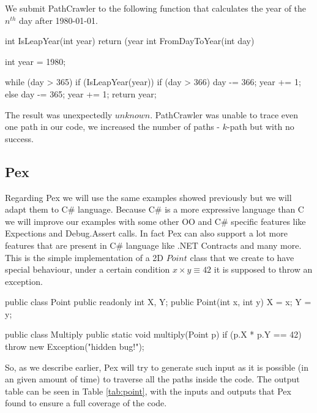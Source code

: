 \documentclass[10pt, conference, compsocconf]{IEEEtran}
\begin{document}
We submit PathCrawler to the following function that calculates the year of the $n^{th}$ day after 1980-01-01.

\begin{code}
int IsLeapYear(int year) {
  return (year %
}
int FromDayToYear(int day) {
  int year = 1980;

  while (day > 365) {
    if (IsLeapYear(year)) {
      if (day > 366) {
        day -= 366;
        year += 1;
      }
    } else {
      day -= 365;
      year += 1;
    }
  }
  return year;
}
\end{code}

The result was unexpectedly $unknown$. PathCrawler was unable to trace even one path in our code, we increased the number of paths - $k$-path but with no success.

\subsection{Pex}
Regarding Pex we will use the same examples showed previously but we will adapt them to C\# language.
Because C\# is a more expressive language than C we will improve our examples with some other OO and C\# specific features like Expections and Debug.Assert calls.
In fact Pex can also support a lot more features that are present in C\# language like .NET Contracts and many more.\\
This is the simple implementation of a 2D $Point$ class that we create to have special behaviour, under a certain condition
$x \times y \equiv 42$ it is supposed to throw an exception.

\begin{code}
public class Point {
  public readonly int X, Y;
  public Point(int x, int y) { X = x; Y = y; }
}

public class Multiply {
  public static void multiply(Point p) {
    if (p.X * p.Y == 42)
        throw new Exception("hidden bug!");
  }
}
\end{code}

So, as we describe earlier, Pex will try to generate such input as it is possible (in an given amount of time) to traverse all the paths inside the code.
The output table can be seen in Table \ref{tab:point}, with the inputs and outputs that Pex found to ensure a full coverage of the code.
\end{document}
